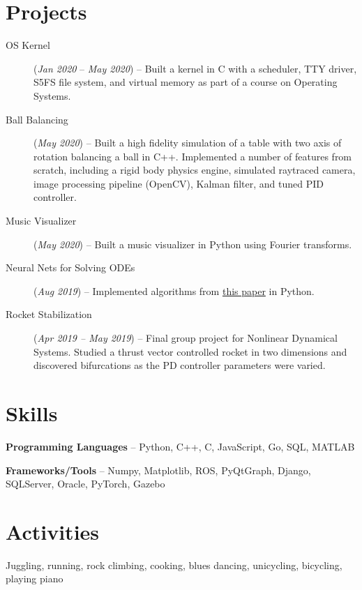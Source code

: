 \documentclass[letterpaper,10pt]{article}
\makeatletter
\newcommand{\resumeItem}[2]{
  \item\small{
    \textbf{#1}{#2 \vspace{-6pt}}
  }
}
\newcommand{\resumeSubheadingSimple}[2]{
  \vspace{-1pt}\item
    \begin{tabular*}{0.97\textwidth}{l@{\extracolsep{\fill}}r}
      \textbf{#1} & \textit{\small#2}\\
    \end{tabular*}\vspace{-3pt}
}
\newcommand{\resumeSubHeadingListStart}{}
\newcommand{\resumeSubHeadingListEnd}{}
\newcommand{\resumeItemListStart}{\begin{itemize}}
\newcommand{\resumeItemListEnd}{\end{itemize}}
\makeatother
\begin{document}
\section{Projects}
\small{
\begin{description}
  \item[OS Kernel] (\textit{Jan 2020} -- \textit{May 2020}) -- Built a kernel in C with a scheduler, TTY driver, S5FS file system, and virtual memory as part of a course on Operating Systems.
  \item[Ball Balancing] (\textit{May 2020}) -- Built a high fidelity simulation of a table with two axis of rotation balancing a ball in C++. Implemented a number of features from scratch, including a rigid body physics engine, simulated raytraced camera, image processing pipeline (OpenCV), Kalman filter, and tuned PID controller.
  \item[Music Visualizer] (\textit{May 2020}) -- Built a music visualizer in Python using Fourier transforms.
  \item[Neural Nets for Solving ODEs] (\textit{Aug 2019}) -- Implemented algorithms from \href{https://arxiv.org/abs/physics/9705023}{this paper} in Python.
  \item[Rocket Stabilization] (\textit{Apr 2019 -- May 2019}) -- Final group project for Nonlinear Dynamical Systems. Studied a thrust vector controlled rocket in two dimensions and discovered bifurcations as the PD controller parameters were varied.
\end{description}
}
\section{Skills}
  \resumeSubHeadingListStart
    \item \textbf{Programming Languages} -- Python, C++, C, JavaScript, Go, SQL, MATLAB
    \item \textbf{Frameworks/Tools} -- Numpy, Matplotlib, ROS, PyQtGraph, Django, SQLServer, Oracle, PyTorch, Gazebo
  \resumeSubHeadingListEnd
\section{Activities}
    \resumeSubHeadingListStart
    \item Juggling, running, rock climbing, cooking, blues dancing, unicycling, bicycling, playing piano
  \resumeSubHeadingListEnd
\end{document}
